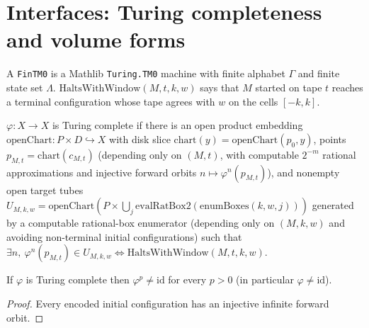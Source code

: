 \chapter{Interfaces: Turing completeness and volume forms}
\label{chap_interfaces}

\begin{definition}
\label{def_fintm0}
\leanok
A \texttt{FinTM0} is a Mathlib \texttt{Turing.TM0} machine with finite alphabet $\Gamma$ and finite
state set $\Lambda$. $\mathrm{HaltsWithWindow}(M,t,k,w)$ says that $M$ started on tape $t$ reaches
a terminal configuration whose tape agrees with $w$ on the cells $[-k,k]$.
\end{definition}

\begin{definition}
\label{def_turing_complete}
\leanok
{}
$\varphi\colon X\to X$ is Turing complete if there is an open product embedding
$\mathrm{openChart}\colon P\times D\hookrightarrow X$ with disk slice $\mathrm{chart}(y)=\mathrm{openChart}(p_0,y)$,
points $p_{M,t}=\mathrm{chart}(c_{M,t})$ (depending only on $(M,t)$, with computable $2^{-m}$
rational approximations and injective forward orbits $n\mapsto\varphi^n(p_{M,t})$), and nonempty
open target tubes $U_{M,k,w}=\mathrm{openChart}(P\times\bigcup_j \mathrm{evalRatBox2}(\mathrm{enumBoxes}(k,w,j)))$
generated by a computable rational-box enumerator (depending only on $(M,k,w)$ and avoiding
non-terminal initial configurations) such that
$\exists n,\ \varphi^n(p_{M,t})\in U_{M,k,w} \iff \mathrm{HaltsWithWindow}(M,t,k,w)$.
\end{definition}

\begin{lemma}
\label{lem_tc_ne_id}
\leanok
{}
If $\varphi$ is Turing complete then $\varphi^p\neq\mathrm{id}$ for every $p>0$ (in particular
$\varphi\neq\mathrm{id}$).
\end{lemma}
\begin{proof}\leanok
Every encoded initial configuration has an injective infinite forward orbit.
\end{proof}

